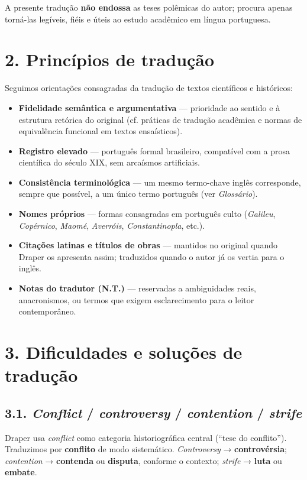\documentclass[11pt,a5paper,twoside,openany]{book}
\begin{document}
A presente tradução \textbf{não endossa} as teses polêmicas do autor; procura apenas torná-las legíveis, fiéis e úteis ao estudo acadêmico em língua portuguesa.

\section*{2. Princípios de tradução}
Seguimos orientações consagradas da tradução de textos científicos e históricos:

\begin{itemize}
\item \textbf{Fidelidade semântica e argumentativa} — prioridade ao sentido e à estrutura retórica do original (cf. práticas de tradução acadêmica e normas de equivalência funcional em textos ensaísticos).
\item \textbf{Registro elevado} — português formal brasileiro, compatível com a prosa científica do século XIX, sem arcaísmos artificiais.
\item \textbf{Consistência terminológica} — um mesmo termo-chave inglês corresponde, sempre que possível, a um único termo português (ver \textit{Glossário}).
\item \textbf{Nomes próprios} — formas consagradas em português culto (\textit{Galileu}, \textit{Copérnico}, \textit{Maomé}, \textit{Averróis}, \textit{Constantinopla}, etc.).
\item \textbf{Citações latinas e títulos de obras} — mantidos no original quando Draper os apresenta assim; traduzidos quando o autor já os vertia para o inglês.
\item \textbf{Notas do tradutor (N.T.)} — reservadas a ambiguidades reais, anacronismos, ou termos que exigem esclarecimento para o leitor contemporâneo.
\end{itemize}
\section*{3. Dificuldades e soluções de tradução}
\subsection*{3.1. \textit{Conflict} / \textit{controversy} / \textit{contention} / \textit{strife}}
Draper usa \textit{conflict} como categoria historiográfica central (“tese do conflito”). Traduzimos por \textbf{conflito} de modo sistemático. \textit{Controversy} → \textbf{controvérsia}; \textit{contention} → \textbf{contenda} ou \textbf{disputa}, conforme o contexto; \textit{strife} → \textbf{luta} ou \textbf{embate}.
\end{document}
